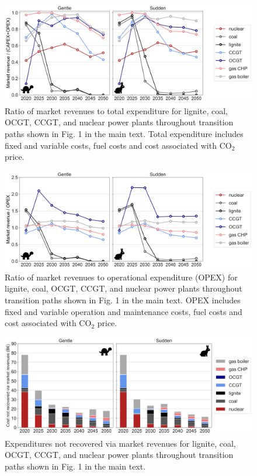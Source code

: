 \documentclass[3p]{elsarticle} %
\begin{document}
\begin{figure}[!h]
\centering
\includegraphics[width=0.8\columnwidth]{figures/revenue_vs_expenditure_Base.png}
\caption{Ratio of market revenues to total expenditure for lignite, coal, OCGT, CCGT, and nuclear power plants throughout transition paths shown in Fig. 1 in the main text. Total expenditure includes fixed and variable costs, fuel costs and cost associated with CO$_2$ price. } \label{fig_revenues_vs_expenditure} 
\end{figure}

\begin{figure}[!h]
\centering
\includegraphics[width=0.8\columnwidth]{figures/revenue_vs_variablecost_Base.png}
\caption{Ratio of market revenues to operational expenditure (OPEX) for lignite, coal, OCGT, CCGT, and nuclear power plants throughout transition paths shown in Fig. 1 in the main text. OPEX includes fixed and variable operation and maintenance costs, fuel costs and cost associated with CO$_2$ price. } \label{fig_revenues_vs_variable} 
\end{figure}


\begin{figure}[!h]
\centering
\includegraphics[width=0.8\columnwidth]{figures/deficit_Base.png}
\caption{Expenditures not recovered via market revenues for lignite, coal, OCGT, CCGT, and nuclear power plants throughout transition paths shown in Fig. 1 in the main text.} \label{fig_deficit} 
\end{figure}
\end{document}
